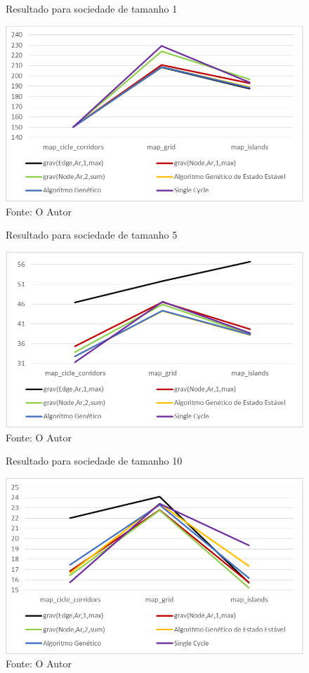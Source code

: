 \begin{figure}[b]
	\caption[Resultado para sociedade de tamanho 1]{Resultado para sociedade 
		de tamanho 1}
	\centering
	\includegraphics[width=\columnwidth]{images/graph_agent1.png}
	\caption*{Fonte: O Autor}
	\label{fig:graph_agentes1}
\end{figure}

\begin{figure}
	\caption[Resultado para sociedade de tamanho 5]{Resultado para sociedade 
		de tamanho 5}
	\centering
	\includegraphics[width=\columnwidth]{images/graph_agent2.png}
	\caption*{Fonte: O Autor}
	\label{fig:graph_agentes2}
\end{figure}

\begin{figure}
	\caption[Resultado para sociedade de tamanho 10]{Resultado para sociedade 
		de tamanho 10}
	\centering
	\includegraphics[width=\columnwidth]{images/graph_agent3.png}
	\caption*{Fonte: O Autor}
	\label{fig:graph_agentes3}
\end{figure}


